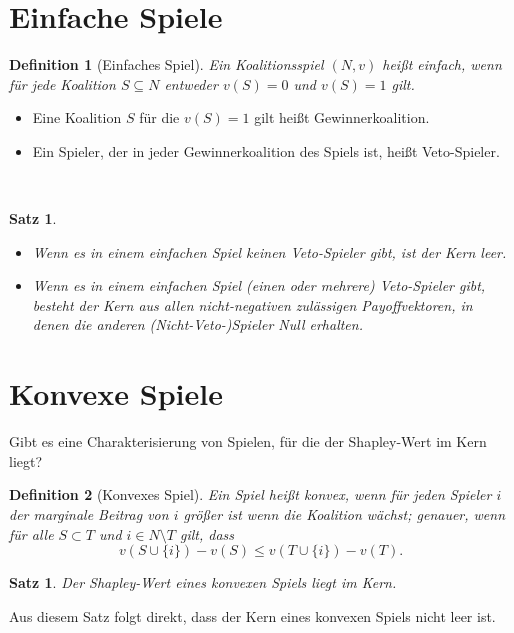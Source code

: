 \documentclass[12pt]{extreport} %
\theoremstyle{named}
\theoremstyle{itshape}
\newtheorem{satz}[unnamedtheorem]{Satz}
\newtheorem*{definition}{Definition}
\theoremstyle{normal}
\begin{document}
\section{Einfache Spiele} 

\begin{definition}[Einfaches Spiel]
	Ein Koalitionsspiel $(N, v)$ hei{\ss}t einfach, wenn für jede Koalition $S \subseteq N$ entweder $v(S) = 0$ und $v(S) = 1$ gilt.
\end{definition}

\begin{itemize}
	\item Eine Koalition $S$ für die $v(S) = 1$ gilt hei{\ss}t Gewinnerkoalition.
	\item Ein Spieler, der in jeder Gewinnerkoalition des Spiels ist, hei{\ss}t Veto-Spieler.
\end{itemize} ~\newpage

\begin{satz} ~\
	\begin{itemize}
		\item Wenn es in einem einfachen Spiel keinen Veto-Spieler gibt, ist der Kern leer.
		\item Wenn es in einem einfachen Spiel (einen oder mehrere) Veto-Spieler gibt, besteht der Kern aus allen nicht-negativen zulässigen Payoffvektoren, in denen die anderen (Nicht-Veto-)Spieler Null erhalten.
	\end{itemize}
\end{satz}

\section{Konvexe Spiele} 

Gibt es eine Charakterisierung von Spielen, für die der Shapley-Wert im Kern liegt?

\begin{definition}[Konvexes Spiel]
	Ein Spiel heißt konvex, wenn für jeden Spieler $i$ der marginale Beitrag von $i$ grö{\ss}er ist wenn die Koalition wächst; genauer, wenn für alle $S \subset T$ und $i \in N \setminus T$ gilt, dass
	$$ v( S \cup \{i\}) - v(S) \leq v( T \cup \{ i \}) - v(T). $$
\end{definition}

\begin{satz}
	Der Shapley-Wert eines konvexen Spiels liegt im Kern.
\end{satz}
Aus diesem Satz folgt direkt, dass der Kern eines konvexen Spiels nicht leer ist.
\end{document}
